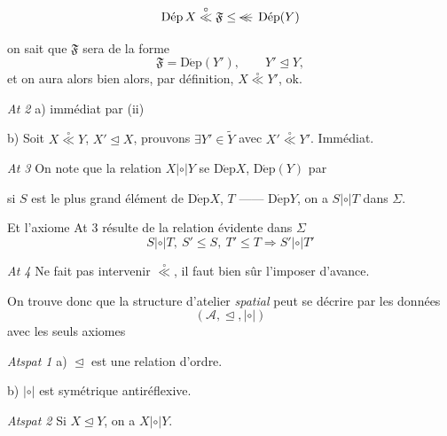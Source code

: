\documentclass[11pt,a4paper]{article}
\begin{document}
\[
  \operatorname{D\acute{e}p} X \overset{\circ}{\ll} \mathfrak{F}
  \leq \text{\struck{$\ll$}}\ \operatorname{D\acute{e}p}(Y)
\]

on sait que $\mathfrak{F}$ sera de la forme 
\[
  \mathfrak{F} = \operatorname{D\acute{e}p}(Y'), \qquad Y' \trianglelefteq Y ,
\]
et on aura alors bien alors, par définition, $X \overset{\circ}{\ll} Y'$, ok.

\emph{At 2} \quad a) immédiat par (ii)

\quad b) Soit $X \overset{\circ}{\ll} Y$, $X' \trianglelefteq X$, prouvons
$\exists Y' \in \widetilde{Y}$ avec $X' \overset{\circ}{\ll} Y'$. Immédiat.

\emph{At 3} \quad On note que la relation $X \mathrel{|\circ|} Y$ se
 
$\operatorname{D\acute{e}p} X$, $\operatorname{D\acute{e}p}(Y)$ par

si $S$ est le plus grand élément de $\operatorname{D\acute{e}p} X$, $T$
------ $\operatorname{D\acute{e}p} Y$, on a $S \mathrel{|\circ|} T$ dans
$\Sigma$.

Et l'axiome At 3 résulte de la relation évidente dans $\Sigma$
\[
  S \mathrel{|\circ|} T,\ S' \leq S,\ T' \leq T \Longrightarrow
  S' \mathrel{|\circ|} T'
\]

\emph{At 4} \quad {} Ne fait pas intervenir
$\overset{\circ}{\ll}$,  il faut bien sûr l'imposer
d'avance.


On trouve donc que la structure d'atelier \emph{spatial} peut se décrire par les
données
\[
  (\mathcal{A}, \trianglelefteq, \mathrel{|\circ|})
\]
avec les seuls axiomes

\emph{Atspat 1} \quad a) $\trianglelefteq$ est une relation d'ordre.

\quad b) $\mathrel{|\circ|}$ est symétrique antiréflexive.

\emph{Atspat 2} \quad Si $X \trianglelefteq Y$, on a
$X \mathrel{|\circ|} Y$.
\end{document}
